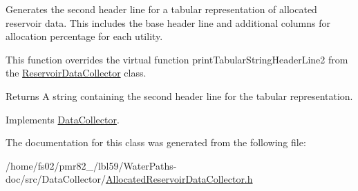 Generates the second header line for a tabular representation of allocated reservoir data. This includes the base header line and additional columns for allocation percentage for each utility. 

This function overrides the virtual function {\ttfamily print\+Tabular\+String\+Header\+Line2} from the {\ttfamily \mbox{\hyperlink{classReservoirDataCollector}{Reservoir\+Data\+Collector}}} class.

\begin{DoxyReturn}{Returns}
A string containing the second header line for the tabular representation. 
\end{DoxyReturn}


Implements \mbox{\hyperlink{classDataCollector_af01ea961314be2164f39e6d4cd59e443}{Data\+Collector}}.



The documentation for this class was generated from the following file\+:\begin{DoxyCompactItemize}
\item 
/home/fs02/pmr82\+\_/lbl59/\+Water\+Paths-\/doc/src/\+Data\+Collector/\mbox{\hyperlink{AllocatedReservoirDataCollector_8h}{Allocated\+Reservoir\+Data\+Collector.\+h}}\end{DoxyCompactItemize}
